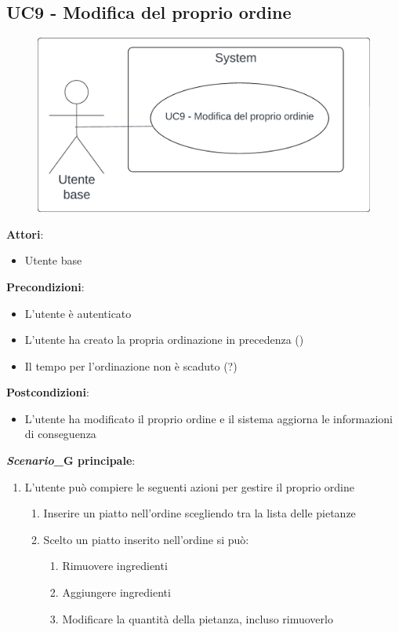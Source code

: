 \subsection{UC9 - Modifica del proprio ordine}\label{usecase:9}
\begin{figure}[H]
    \centering
    \includegraphics[width=0.9\linewidth]{ucd/ucd9.png}
\end{figure}
\textbf{Attori}:
\begin{itemize}
    \item Utente base
\end{itemize}
\textbf{Precondizioni}:
\begin{itemize}
    \item L'utente è autenticato
    \item L'utente ha creato la propria ordinazione in precedenza ()
    \item Il tempo per l'ordinazione non è scaduto (?)
\end{itemize}
\textbf{Postcondizioni}:
\begin{itemize}
    \item L'utente ha modificato il proprio ordine e il sistema aggiorna le informazioni di conseguenza
\end{itemize}
\textbf{\textit{Scenario}_G principale}:
\begin{enumerate}
    \item L'utente può compiere le seguenti azioni per gestire il proprio ordine
    \begin{enumerate}
        \item Inserire un piatto nell'ordine scegliendo tra la lista delle pietanze
        \item Scelto un piatto inserito nell'ordine si può:
        \begin{enumerate}
            \item Rimuovere ingredienti
            \item Aggiungere ingredienti
            \item Modificare la quantità della pietanza, incluso rimuoverlo
        \end{enumerate}
    \end{enumerate}
\end{enumerate}

\newpage
